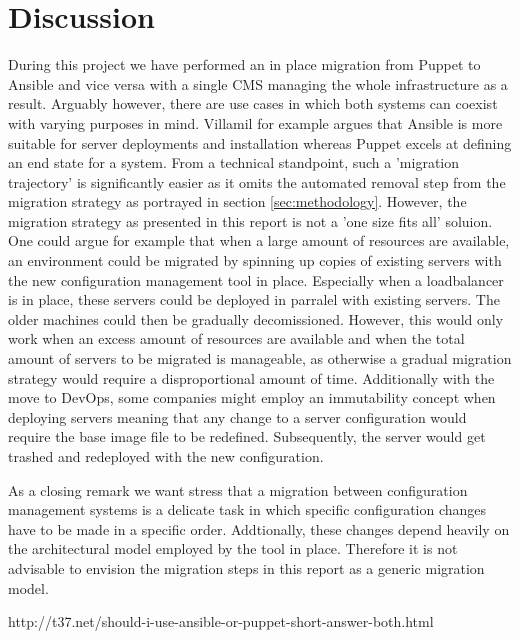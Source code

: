 \section{Discussion}\label{sec:discussion}
During this project we have performed an in place migration from Puppet to Ansible and vice versa with a single CMS managing the whole infrastructure as a result. Arguably however, there are use cases in which both systems can coexist with varying purposes in mind. Villamil \cite{} for example argues that Ansible is more suitable for server deployments and installation whereas Puppet excels at defining an end state for a system. From a technical standpoint, such a 'migration trajectory' is significantly easier as it omits the automated removal step from the migration strategy as portrayed in section \ref{sec:methodology}. However, the migration strategy as presented in this report is not a 'one size fits all' soluion. One could argue for example that when a large amount of resources are available, an environment could be migrated by spinning up copies of existing servers with the new configuration management tool in place. Especially when a loadbalancer is in place, these servers could be deployed in parralel with existing servers. The older machines could then be gradually decomissioned. However, this would only work when an excess amount of resources are available and when the total amount of servers to be migrated is manageable, as otherwise a gradual migration strategy would require a disproportional amount of time. Additionally with the move to DevOps, some companies might employ an immutability concept when deploying servers meaning that any change to a server configuration would require the base image file to be redefined. Subsequently, the server would get trashed and redeployed with the new configuration. 

As a closing remark we want stress that a migration between configuration management systems is a delicate task in which specific configuration changes have to be made in a specific order. Addtionally, these changes depend heavily on the architectural model employed by the tool in place. Therefore it is not advisable to envision the migration steps in this report as a generic migration model.  

http://t37.net/should-i-use-ansible-or-puppet-short-answer-both.html
